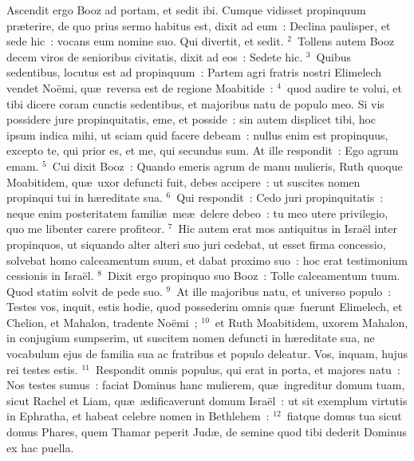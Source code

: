 \lettrine[lines=3,image=true,loversize=0.05,lraise=-0.03]{A}{}scendit ergo Booz ad portam, et sedit ibi. Cumque vidisset propinquum pr\ae terire, de quo prius sermo habitus est, dixit ad eum~: Declina paulisper, et sede hic~: vocans eum nomine suo. Qui divertit, et sedit.
${}^{2}$~Tollens autem Booz decem viros de senioribus civitatis, dixit ad eos~: Sedete hic.
${}^{3}$~Quibus sedentibus, locutus est ad propinquum~: Partem agri fratris nostri Elimelech vendet No\"emi, qu\ae\ reversa est de regione Moabitide~:
${}^{4}$~quod audire te volui, et tibi dicere coram cunctis sedentibus, et majoribus natu de populo meo. Si vis possidere jure propinquitatis, eme, et posside~: sin autem displicet tibi, hoc ipsum indica mihi, ut sciam quid facere debeam~: nullus enim est propinquus, excepto te, qui prior es, et me, qui secundus sum. At ille respondit~: Ego agrum emam.
${}^{5}$~Cui dixit Booz~: Quando emeris agrum de manu mulieris, Ruth quoque Moabitidem, qu\ae\ uxor defuncti fuit, debes accipere~: ut suscites nomen propinqui tui in h\ae reditate sua.
${}^{6}$~Qui respondit~: Cedo juri propinquitatis~: neque enim posteritatem famili\ae\ me\ae\ delere debeo~: tu meo utere privilegio, quo me libenter carere profiteor.
${}^{7}$~Hic autem erat mos antiquitus in Isra\"el inter propinquos, ut siquando alter alteri suo juri cedebat, ut esset firma concessio, solvebat homo calceamentum suum, et dabat proximo suo~: hoc erat testimonium cessionis in Isra\"el.
${}^{8}$~Dixit ergo propinquo suo Booz~: Tolle calceamentum tuum. Quod statim solvit de pede suo.
${}^{9}$~At ille majoribus natu, et universo populo~: Testes vos, inquit, estis hodie, quod possederim omnis qu\ae\ fuerunt Elimelech, et Chelion, et Mahalon, tradente No\"emi~;
${}^{10}$~et Ruth Moabitidem, uxorem Mahalon, in conjugium sumpserim, ut suscitem nomen defuncti in h\ae reditate sua, ne vocabulum ejus de familia sua ac fratribus et populo deleatur. Vos, inquam, hujus rei testes estis.
${}^{11}$~Respondit omnis populus, qui erat in porta, et majores natu~: Nos testes sumus~: faciat Dominus hanc mulierem, qu\ae\ ingreditur domum tuam, sicut Rachel et Liam, qu\ae\ \ae dificaverunt domum Isra\"el~: ut sit exemplum virtutis in Ephratha, et habeat celebre nomen in Bethlehem~:
${}^{12}$~fiatque domus tua sicut domus Phares, quem Thamar peperit Jud\ae , de semine quod tibi dederit Dominus ex hac puella.


